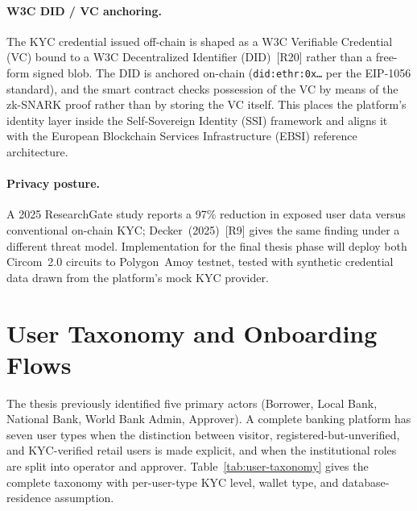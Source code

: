\documentclass[12pt,a4paper]{report}
\begin{document}
\paragraph{W3C DID / VC anchoring.}
The KYC credential issued off-chain is shaped as a W3C Verifiable Credential (VC) bound to a W3C Decentralized Identifier (DID)~[R20] rather than a free-form signed blob. The DID is anchored on-chain (\texttt{did:ethr:0x\ldots} per the EIP-1056 standard), and the smart contract checks possession of the VC by means of the zk-SNARK proof rather than by storing the VC itself. This places the platform's identity layer inside the Self-Sovereign Identity (SSI) framework and aligns it with the European Blockchain Services Infrastructure (EBSI) reference architecture.

\paragraph{Privacy posture.}
A 2025 ResearchGate study reports a 97\% reduction in exposed user data versus conventional on-chain KYC; Decker~(2025)~[R9] gives the same finding under a different threat model. Implementation for the final thesis phase will deploy both Circom~2.0 circuits to Polygon~Amoy testnet, tested with synthetic credential data drawn from the platform's mock KYC provider.

\section{User Taxonomy and Onboarding Flows}
\label{sec:onboarding}

The thesis previously identified five primary actors (Borrower, Local Bank, National Bank, World Bank Admin, Approver). A complete banking platform has seven user types when the distinction between visitor, registered-but-unverified, and KYC-verified retail users is made explicit, and when the institutional roles are split into operator and approver. Table~\ref{tab:user-taxonomy} gives the complete taxonomy with per-user-type KYC level, wallet type, and database-residence assumption.
\end{document}
